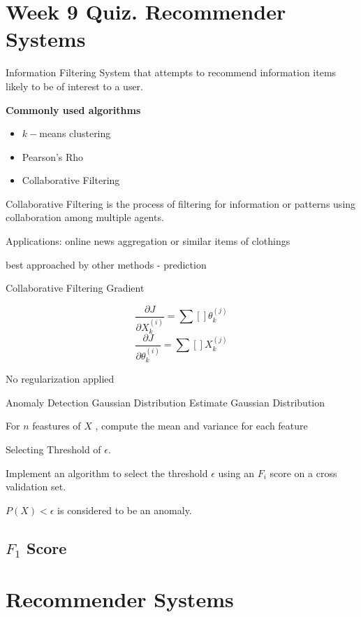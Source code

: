 \documentclass[11pt]{article} %
\begin{document}

\section{Week 9 Quiz. Recommender Systems}

Information Filtering System that attempts to recommend information items likely
to be of interest to a user.

\textbf{Commonly used algorithms}
\begin{itemize}
	\item $k-$means clustering
	\item Pearson's Rho
	\item Collaborative Filtering
\end{itemize}

Collaborative Filtering is the process of filtering for information or patterns using collaboration among multiple
agents.

Applications: online news aggregation or similar items of clothings

best approached by other methods - prediction

Collaborative Filtering Gradient

\[ \frac{\partial J}{\partial X^{(i)}_k}  = \sum [  ] \theta^{(j)}_k \]
\[ \frac{\partial J}{\partial \theta^{(i)}_k}  = \sum [  ] X^{(j)}_k \]

No regularization applied

Anomaly Detection
Gaussian Distribution
Estimate Gaussian Distribution

For $n$ feastures of $X$ , compute the mean and variance for each feature

Selecting Threshold of $\epsilon$.

Implement an algorithm to select the threshold $\epsilon$ using an $F_i$ score on a 
cross validation set.

$P(X) < \epsilon$ is considered to be an anomaly.

\subsection{$F_1$ Score}



\section*{Recommender Systems}
\end{document}
